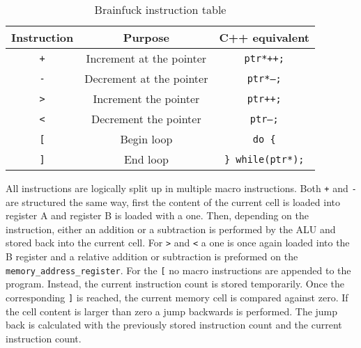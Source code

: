 \begin{table}[H]
\begin{center}
\begin{tabular}{ccc}
Instruction    & Purpose                  & C++ equivalent                       \\ \hline
\texttt{+}             & Increment at the pointer & \texttt{ptr*++;}                   \\
\texttt{-}               & Decrement at the pointer & \texttt{ptr*--;}                   \\
\texttt{\textgreater{}} & Increment the pointer    & \texttt{ptr++;}                    \\
\texttt{\textless{}}   & Decrement the pointer    & \texttt{ptr--;}                    \\
\texttt{{[}}            & Begin loop               & \texttt{do \{}                     \\
\texttt{{]}}            & End loop              & \texttt{\} while(ptr*);}
\end{tabular}
\end{center}
\caption{Brainfuck instruction table}
\label{tab:brainfuck-instructions}
\end{table}

All instructions are logically split up in multiple macro instructions. Both \texttt{+} and \texttt{-} are structured the same way, first the content of the current cell is loaded into register A and register B is loaded with a one. Then, depending on the instruction, either an addition or a subtraction is performed by the ALU and stored back into the current cell. For \texttt{\textgreater} and \texttt{\textless} a one is once again loaded into the B register and a relative addition or subtraction is preformed on the \texttt{memory\_address\_register}. For the \texttt{{[}} no macro instructions are appended to the program. Instead, the current instruction count is stored temporarily. Once the corresponding \texttt{{]}} is reached, the current memory cell is compared against zero. If the cell content is larger than zero a jump backwards is performed. The jump back is calculated with the previously stored instruction count and the current instruction count.


